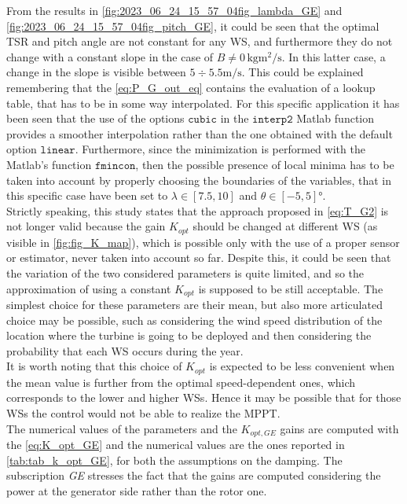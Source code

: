 From the results in \autoref{fig:2023_06_24_15_57_04fig_lambda_GE} and \ref{fig:2023_06_24_15_57_04fig_pitch_GE}, it could be seen that the optimal TSR and pitch angle are not constant for any WS, and furthermore they do not change with a constant slope in the case of $B\neq0 \, \si{\kilo\gram\square\meter\per\second}$. In this latter case, a change in the slope is visible between $5\div5.5 \si{\meter \per\second}$. This could be explained remembering that the \autoref{eq:P_G_out_eq} contains the evaluation of a lookup table, that has to be in some way interpolated. For this specific application it has been seen that the use of the options $\texttt{cubic}$ in the $\texttt{interp2}$ Matlab function provides a smoother interpolation rather than the one obtained with the default option $\texttt{linear}$. Furthermore, since the minimization is performed with the Matlab's function $\texttt{fmincon}$, then the possible presence of local minima has to be taken into account by properly choosing the boundaries of the variables, that in this specific case have been set to $\lambda \in \left[7.5, 10\right]$ and $\theta\in\left[-5, 5\right] \si{\degree}$.  \\
Strictly speaking, this study states that the approach proposed in \autoref{eq:T_G2} is not longer valid because the gain $K_{opt}$ should be changed at different WS (as visible in \autoref{fig:fig_K_map}), which is possible only with the use of a proper sensor or estimator, never taken into account so far. Despite this, it could be seen that the variation of the two considered parameters is quite limited, and so the approximation of using a constant $K_{opt}$ is supposed to be still acceptable. The simplest choice for these parameters are their mean, but also more articulated choice may be possible, such as considering the wind speed distribution of the location where the turbine is going to be deployed and then considering the probability that each WS occurs during the year.\\
It is worth noting that this choice of $K_{opt}$ is expected to be less convenient when the mean value is further from the optimal speed-dependent ones, which corresponds to the lower and higher WSs. Hence it may be possible that for those WSs the control would not be able to realize the MPPT.\\ 
The numerical values of the parameters and the $K_{opt,GE}$ gains are computed with the \autoref{eq:K_opt_GE} and the numerical values are the ones reported in \autoref{tab:tab_k_opt_GE}, for both the assumptions on the damping. The subscription \textit{GE} stresses the fact that the gains are computed considering the power at the generator side rather than the rotor one.

